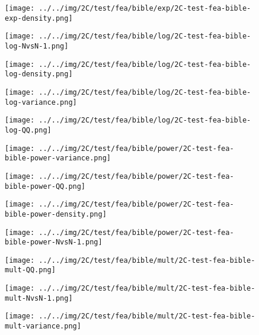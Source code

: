 \begin{figure}[H]
\centering	\texttt{[image: ../../img/2C/test/fea/bible/exp/2C-test-fea-bible-exp-density.png]}
\end{figure}
\begin{figure}[H]
\centering	\texttt{[image: ../../img/2C/test/fea/bible/log/2C-test-fea-bible-log-NvsN-1.png]}
\end{figure}
\begin{figure}[H]
\centering	\texttt{[image: ../../img/2C/test/fea/bible/log/2C-test-fea-bible-log-density.png]}
\end{figure}
\begin{figure}[H]
\centering	\texttt{[image: ../../img/2C/test/fea/bible/log/2C-test-fea-bible-log-variance.png]}
\end{figure}
\begin{figure}[H]
\centering	\texttt{[image: ../../img/2C/test/fea/bible/log/2C-test-fea-bible-log-QQ.png]}
\end{figure}
\begin{figure}[H]
\centering	\texttt{[image: ../../img/2C/test/fea/bible/power/2C-test-fea-bible-power-variance.png]}
\end{figure}
\begin{figure}[H]
\centering	\texttt{[image: ../../img/2C/test/fea/bible/power/2C-test-fea-bible-power-QQ.png]}
\end{figure}
\begin{figure}[H]
\centering	\texttt{[image: ../../img/2C/test/fea/bible/power/2C-test-fea-bible-power-density.png]}
\end{figure}
\begin{figure}[H]
\centering	\texttt{[image: ../../img/2C/test/fea/bible/power/2C-test-fea-bible-power-NvsN-1.png]}
\end{figure}
\begin{figure}[H]
\centering	\texttt{[image: ../../img/2C/test/fea/bible/mult/2C-test-fea-bible-mult-QQ.png]}
\end{figure}
\begin{figure}[H]
\centering	\texttt{[image: ../../img/2C/test/fea/bible/mult/2C-test-fea-bible-mult-NvsN-1.png]}
\end{figure}
\begin{figure}[H]
\centering	\texttt{[image: ../../img/2C/test/fea/bible/mult/2C-test-fea-bible-mult-variance.png]}
\end{figure}
